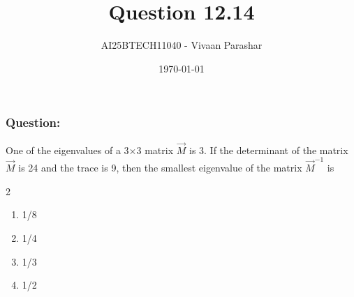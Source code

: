 \documentclass{beamer}
\title{Question 12.14}
\author{AI25BTECH11040 - Vivaan Parashar}
\date{\today}
\begin{document}
\frame{\titlepage}

\begin{frame}
    \frametitle{Question: }
    One of the eigenvalues of a 3$\times$3 matrix $\vec{M}$ is 3. If the determinant of the matrix $\vec{M}$ is 24 and the trace is 9, then the smallest eigenvalue of the matrix $\vec{M}^{-1}$ is
    \begin{multicols}{2}
        \begin{enumerate}[label=\alph*)]
            \item 1/8
            \item 1/4
            \item 1/3
            \item 1/2
        \end{enumerate}
    \end{multicols}
\end{frame}
\end{document}
